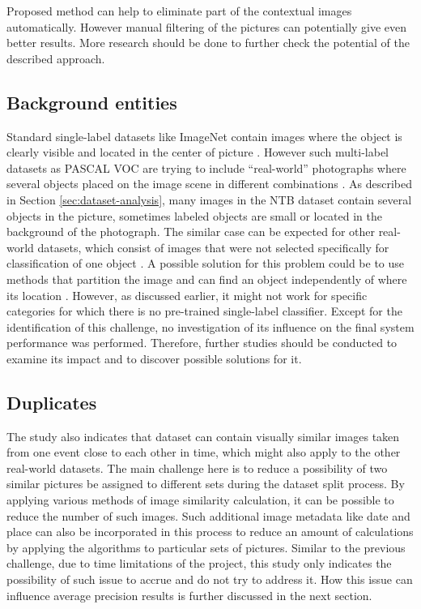 Proposed method can help to eliminate part of the contextual images automatically. However manual filtering of the pictures can potentially give even better results. More research should be done to further check the potential of the described approach.

\subsection{Background entities}
Standard single-label datasets like ImageNet contain images where the object is clearly visible and located in the center of picture \cite{Russakovsky2015ImageNet}. However such multi-label datasets as PASCAL VOC are trying to include ``real-world'' photographs where several objects placed on the image scene in different combinations \cite{Everingham2010PASCAL-VOC}. As described in Section \ref{sec:dataset-analysis}, many images in the NTB dataset contain several objects in the picture, sometimes labeled objects are small or located in the background of the photograph. The similar case can be expected for other real-world datasets, which consist of images that were not selected specifically for classification of one object \cite{Wang2016CNN-RNN:Classification}. A possible solution for this problem could be to use methods that partition the image and can find an object independently of where its location \cite{Ren2016, Yang2015, Wei2016HCP}. However, as discussed earlier, it might not work for specific categories for which there is no pre-trained single-label classifier. Except for the identification of this challenge, no investigation of its influence on the final system performance was performed. Therefore, further studies should be conducted to examine its impact and to discover possible solutions for it.

\subsection{Duplicates}
The study also indicates that dataset can contain visually similar images taken from one event close to each other in time, which might also apply to the other real-world datasets. The main challenge here is to reduce a possibility of two similar pictures be assigned to different sets during the dataset split process. By applying various methods of image similarity calculation, it can be possible to reduce the number of such images. Such additional image metadata like date and place can also be incorporated in this process to reduce an amount of calculations by applying the algorithms to particular sets of pictures. Similar to the previous challenge, due to time limitations of the project, this study only indicates the possibility of such issue to accrue and do not try to address it. How this issue can influence average precision results is further discussed in the next section.

